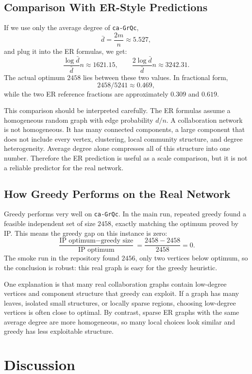 \documentclass[11pt]{article}
\begin{document}
\subsection{Comparison With ER-Style Predictions}

If we use only the average degree of \texttt{ca-GrQc},
\[
  \bar d = \frac{2m}{n} \approx 5.527,
\]
and plug it into the ER formulas, we get:
\[
  \frac{\log \bar d}{\bar d}n \approx 1621.15,
  \qquad
  \frac{2\log \bar d}{\bar d}n \approx 3242.31.
\]
The actual optimum $2458$ lies between these two values. In fractional form,
\[
  2458/5241 \approx 0.469,
\]
while the two ER reference fractions are approximately $0.309$ and $0.619$.

This comparison should be interpreted carefully. The ER formulas assume a
homogeneous random graph with edge probability $d/n$. A collaboration network is
not homogeneous. It has many connected components, a large component that does
not include every vertex, clustering, local community structure, and degree
heterogeneity. Average degree alone compresses all of this structure into one
number. Therefore the ER prediction is useful as a scale comparison, but it is
not a reliable predictor for the real network.

\subsection{How Greedy Performs on the Real Network}

Greedy performs very well on \texttt{ca-GrQc}. In the main run, repeated greedy
found a feasible independent set of size $2458$, exactly matching the optimum
proved by IP. This means the greedy gap on this instance is zero:
\[
  \frac{\text{IP optimum} - \text{greedy size}}{\text{IP optimum}}
  = \frac{2458-2458}{2458}=0.
\]
The smoke run in the repository found $2456$, only two vertices below optimum,
so the conclusion is robust: this real graph is easy for the greedy heuristic.

One explanation is that many real collaboration graphs contain low-degree
vertices and component structure that greedy can exploit. If a graph has many
leaves, isolated small structures, or locally sparse regions, choosing
low-degree vertices is often close to optimal. By contrast, sparse ER graphs
with the same average degree are more homogeneous, so many local choices look
similar and greedy has less exploitable structure.

\section{Discussion}
\end{document}
